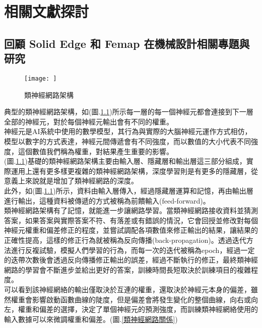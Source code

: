\chapter{相關文獻探討}
\section{回顧 Solid Edge 和 Femap 在機械設計相關專題與研究}
\begin{figure}[hbt!]
\begin{center}
\texttt{[image: ]}
\caption{\Large 類神經網路架構}\label{類神經網路架構}
\end{center}
\end{figure}

 典型的類神經網路架構，如(圖.\ref{類神經網路架構})所示每一層的每一個神經元都會連接到下一層全部的神經元，對於每個神經元輸出會有不同的權重。\\

 神經元是AI系統中使用的數學模型，其行為與實際的大腦神經元運作方式相仿，模型以數字的方式表達，神經元間傳遞會有不同強度，而以數值的大小代表不同強度，這個數值我們稱為權重，對結果產生重要的影響。\\

 (圖.\ref{類神經網路架構})基礎的類神經網路架構主要由輸入層、隱藏層和輸出層這三部分組成，實際運用上還有更多樣更複雜的類神經網路架構，深度學習則是有更多的隱藏層，從意義上來說就是增加了類神經網路的深度。\\

 此外，如(圖.\ref{類神經網路架構})所示，資料由輸入層傳入，經過隱藏層運算和記憶，再由輸出層進行輸出，這種資料被傳遞的方式被稱為前饋輸入(feed-forward)。\\

 類神經網路架構有了記憶，就能進一步讓網路學習。當類神經網路接收資料並猜測答案，如果答案與實際答案不符、有落差或有錯誤的情況，它會回授並修改對每個神經元權重和偏差修正的程度，並嘗試調配各項數值來修正輸出的結果，讓結果的正確性提高，這樣的修正行為就被稱為反向傳播(back-propagation)。透過迭代方法進行反複試驗，模擬人們學習的行為，而每一次的迭代被稱為epoch，經過一定的迭帶次數後會透過反向傳播修正輸出的誤差，經過不斷執行的修正，最終類神經網路的學習會不斷進步並給出更好的答案，訓練時間長短取決於訓練項目的複雜程度。\\

 可以看到該神經網絡的輸出僅取決於互連的權重，還取決於神經元本身的偏差，雖然權重會影響啟動函數曲線的陡度，但是偏差會將發生變化的整個曲線，向右或向左，權重和偏差的選擇，決定了單個神經元的預測強度，而訓練類神經網絡使用的輸入數據可以來微調權重和偏差。(圖.\ref{類神經網路關係})\\

